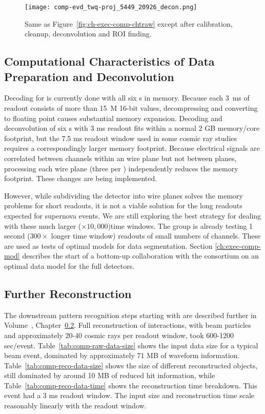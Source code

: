 \begin{figure}[t]
  \texttt{[image: comp-evd\_twq-proj\_5449\_20926\_decon.png]}
\caption{
Same as Figure~\ref{fig:ch-exec-comp-chtraw} except after calibration, cleanup, deconvolution and ROI finding. 
}
\label{fig:ch-exec-comp-chtroi}
\end{figure}


\subsection{Computational Characteristics of Data Preparation and Deconvolution }
Decoding for  is currently done with all six s in memory. Because each \SI{3}{ms} of  readout consists of more than \SI{15}{M} 16-bit values, decompressing and converting to floating point causes substantial memory expansion.  Decoding and deconvolution of six s with 3 ms readout fits within a normal 2 GB memory/core footprint, but the 7.5 ms readout window used in some cosmic ray studies requires a correspondingly larger memory footprint. Because electrical signals are correlated between channels within an  wire plane but not between planes, processing each wire plane (three per ) independently reduces the memory footprint.  These changes are being implemented.


However,  while subdividing the detector into wire planes solves the memory problems for short readouts, it is  not a viable solution for the long readouts expected for supernova events. We are still exploring the best strategy for dealing with these much larger ($\times 10,000$)time windows. The  group is already testing 1 second ($300 \times$ longer time window) readouts of small numbers of channels.  These are used as tests of optimal models for data segmentation.  Section \ref{ch:exec-comp-mod} describes the start of a bottom-up collaboration with the  consortium on an optimal data model for the full  detectors. 

\subsection{Further Reconstruction}
The downstream pattern recognition steps starting with  are described further in %
Volume~\volnumberphysics, Chapter~\ref{}.  
Full reconstruction of  interactions, with beam particles and approximately 20-40 cosmic rays per readout window, took 600-1200 sec/event.
Table~\ref{tab:comp-raw-data-size} shows the input data size for a typical beam event, dominated by approximately 71 MB of  waveform information.  Table~\ref{tab:comp-reco-data-size} shows the size of different reconstructed objects, still dominated by around 10 MB of reduced  hit information,  while Table~\ref{tab:comp-reco-data-time} shows the reconstruction time breakdown.  This event had a 3 ms readout window.  The input size and reconstruction time scale reasonably linearly with the readout window.  


